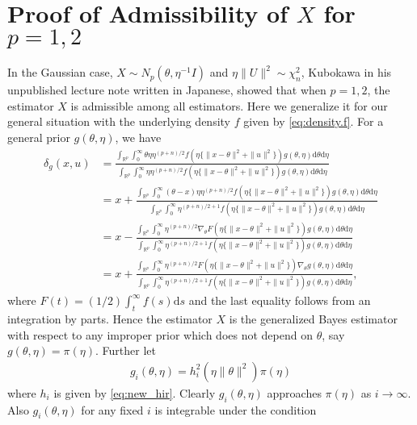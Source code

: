 \documentclass[preprint,11pt]{imsart}
\numberwithin{equation}{section}
\theoremstyle{plain}
\theoremstyle{definition}
\theoremstyle{remark}
\newcommand{\rd}{\mathrm{d}}
\begin{document}
 \section{Proof of Admissibility of $X$ for $p=1,2$}
 \label{p12}
 In the Gaussian case, $X\sim N_p(\theta,\eta^{-1}I)$ and $\eta \|U\|^2\sim \chi^2_n$,
 Kubokawa in his unpublished lecture note written in Japanese,
 showed that when $p=1,2$, the estimator $X$ is admissible among all estimators.
Here we generalize it for our general situation with the underlying density $f$ given by \eqref{eq:density.f}.
For a general prior $g(\theta,\eta)$, 
we have
\begin{equation*}
\begin{split}
 \delta_g (x,u) &=\frac
 {\int_{\mathbb{R}^p}\int_0^\infty \theta \eta \eta^{(p+n)/2}f(\eta\{\|x-\theta\|^2+\|u\|^2\})g(\theta,\eta)\rd \theta \rd \eta}
{\int_{\mathbb{R}^p}\int_0^\infty \eta \eta^{(p+n)/2}f(\eta\{\|x-\theta\|^2+\|u\|^2\})g(\theta,\eta)\rd \theta \rd \eta} \\
&=x + \frac{\int_{\mathbb{R}^p}\int_0^\infty (\theta-x) \eta \eta^{(p+n)/2}f(\eta\{\|x-\theta\|^2+\|u\|^2\})g(\theta,\eta)\rd \theta \rd \eta}{\int_{\mathbb{R}^p}\int_0^\infty \eta^{(p+n)/2+1} f(\eta\{\|x-\theta\|^2+\|u\|^2\})g(\theta,\eta)\rd \theta \rd \eta} \\
 &=
x - \frac{\int_{\mathbb{R}^p}\int_0^\infty \eta^{(p+n)/2}\nabla_\theta F(\eta\{\|x-\theta\|^2+\|u\|^2\})g(\theta,\eta)\rd \theta \rd \eta}{\int_{\mathbb{R}^p}\int_0^\infty \eta^{(p+n)/2+1} f(\eta\{\|x-\theta\|^2+\|u\|^2\})g(\theta,\eta)\rd \theta \rd \eta} \\
 &=
x + \frac{\int_{\mathbb{R}^p}\int_0^\infty  \eta^{(p+n)/2}F(\eta\{\|x-\theta\|^2+\|u\|^2\})\nabla_\theta g(\theta,\eta)\rd \theta \rd \eta}{\int_{\mathbb{R}^p}\int_0^\infty \eta^{(p+n)/2+1} f(\eta\{\|x-\theta\|^2+\|u\|^2\})g(\theta,\eta)\rd \theta \rd \eta}, 
\end{split}
\end{equation*}
where $F(t)=(1/2)\int_t^\infty f(s)\rd s$ and the last equality follows from an integration by parts. 
Hence 
the estimator $X$ is the generalized Bayes estimator
with respect to any improper prior which does not depend on $\theta$, say $g(\theta,\eta)=\pi(\eta)$.
Further let
\begin{align*}
 g_i(\theta,\eta)=h^2_i(\eta\|\theta\|^2)\pi(\eta)
\end{align*}
where $h_i$ is given by \eqref{eq:new_hir}.
Clearly $g_i(\theta,\eta)$ approaches $\pi(\eta)$ as $i\to\infty$.
Also $ g_i(\theta,\eta)$ for any fixed $i$ is integrable under the condition
\end{document}

